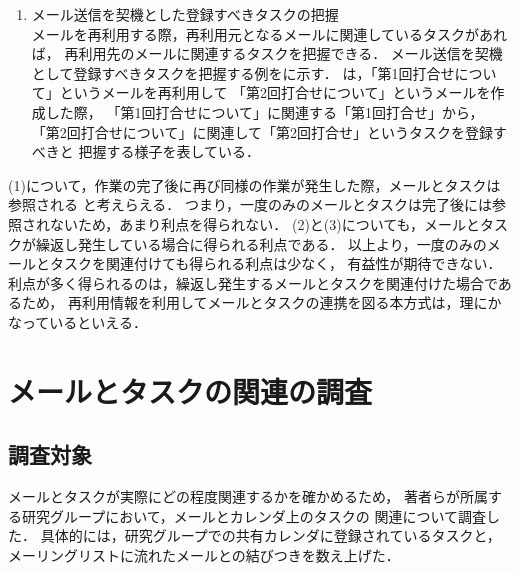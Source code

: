 \documentclass[submit,techreq,noauthor,dvipdfmx]{ipsj}
\begin{document}
\begin{enumerate}
\item メール送信を契機とした登録すべきタスクの把握\\
メールを再利用する際，再利用元となるメールに関連しているタスクがあれば，
再利用先のメールに関連するタスクを把握できる．
メール送信を契機として登録すべきタスクを把握する例をに示す．
は，「第1回打合せについて」というメールを再利用して
「第2回打合せについて」というメールを作成した際，
「第1回打合せについて」に関連する「第1回打合せ」から，
「第2回打合せについて」に関連して「第2回打合せ」というタスクを登録すべきと
把握する様子を表している．

\end{enumerate}

(1)について，作業の完了後に再び同様の作業が発生した際，メールとタスクは参照される
と考えらえる．
つまり，一度のみのメールとタスクは完了後には参照されないため，あまり利点を得られない．
(2)と(3)についても，メールとタスクが繰返し発生している場合に得られる利点である．
以上より，一度のみのメールとタスクを関連付けても得られる利点は少なく，
有益性が期待できない．
利点が多く得られるのは，繰返し発生するメールとタスクを関連付けた場合であるため，
再利用情報を利用してメールとタスクの連携を図る本方式は，理にかなっているといえる．

\section{メールとタスクの関連の調査}\label{sec:task_research}

\subsection{調査対象}\label{sec:research_target}

メールとタスクが実際にどの程度関連するかを確かめるため，
著者らが所属する研究グループにおいて，メールとカレンダ上のタスクの
関連について調査した．
具体的には，研究グループでの共有カレンダに登録されているタスクと，
メーリングリストに流れたメールとの結びつきを数え上げた．
\end{document}
